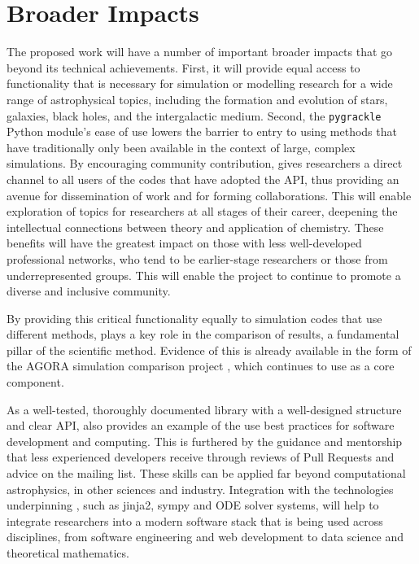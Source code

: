 \section{Broader Impacts}

The proposed work will have a number of important broader impacts that go
beyond its technical achievements.  First, it will provide equal
access to functionality that is necessary for simulation or modelling
research for a wide range of astrophysical topics, including the
formation and evolution of stars, galaxies, black holes, and the
intergalactic medium.
Second, the \texttt{pygrackle} Python module's ease of use lowers the
barrier to entry to using methods that have traditionally only been
available in the context of large, complex simulations.  By
encouraging community contribution, \grackle{} gives researchers
a direct channel to all users of the codes that have adopted the
\grackle{} API, thus providing an avenue for dissemination of
work and for forming collaborations.  This will enable exploration of topics
for researchers at all stages of their career, deepening the intellectual connections between
theory and application of chemistry.  These benefits will have the
greatest impact on those with less well-developed professional
networks, who tend to be earlier-stage researchers or those from
underrepresented groups.  This will enable the \grackle{} project
to continue to promote a diverse and inclusive community.

By providing this critical functionality equally to simulation codes
that use different methods, \grackle{} plays a key role in the comparison of
results, a fundamental pillar of the scientific method.  Evidence of
this is already available in the form of the AGORA simulation
comparison project \citep{2014ApJS..210...14K, 2016ApJ...833..202K},
which continues to use \grackle{} as a core component.

As a well-tested, thoroughly documented library with a well-designed
structure and clear API, \grackle{} also provides an example of the
use best practices for software development and computing.  This is
furthered by the guidance and mentorship that less experienced
developers receive through reviews of Pull Requests and
advice on the mailing list.  These skills can be applied far
beyond computational astrophysics, in other sciences and industry.  Integration
with the technologies underpinning \dengo{}, such as jinja2, sympy and ODE
solver systems, will help to integrate researchers into a modern software stack
that is being used across disciplines, from software engineering and web
development to data science and theoretical mathematics.
